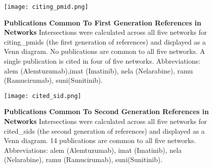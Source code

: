 \documentclass[10pt,letterpaper]{article}
\begin{document}
\begin{figure}[!h]
\centering
\texttt{[image: citing\_pmid.png]}
\caption{{\bf Publications Common To First Generation References in Networks}
Intersections were calculated across all five networks for citing\_pmids (the first generation of references) and displayed as a Venn diagram.
No publications are common to all five networks. A single publication is cited in four of five networks. Abbreviations: alem (Alemtuzumab),imat (Imatinib), nela (Nelarabine), ramu (Ramucirumab), suni(Sunitinib).}
\label{fig1}
\end{figure}

\begin{figure}[!h]
\centering
\texttt{[image: cited\_sid.png]}
\caption{{\bf Publications Common To Second Generation References in Networks}
Intersections were calculated across all five networks for cited\_sids (the second generation of references) and displayed as a Venn diagram.
14  publications are common to all five networks. Abbreviations: alem (Alemtuzumab), imat (Imatinib), nela (Nelarabine), ramu (Ramucirumab), suni(Sunitinib).}
\label{fig2}
\end{figure}
\end{document}
